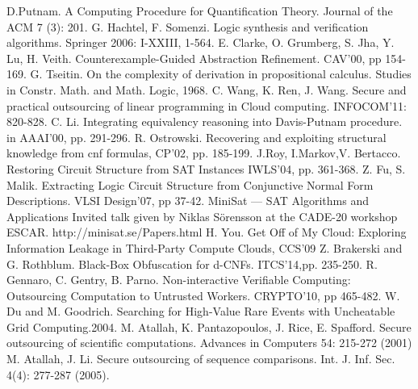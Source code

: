 \documentclass[runningheads,a4paper]{llncs}
\begin{document}
\begin{thebibliography}{4}


	D.Putnam. A Computing Procedure for Quantification Theory. 
Journal of the ACM 7 (3): 201.
	G. Hachtel, F. Somenzi.
Logic synthesis and verification algorithms. Springer 2006: I-XXIII, 1-564.
	E. Clarke, O. Grumberg, S. Jha, Y. Lu, H. Veith.
Counterexample-Guided Abstraction Refinement. 
CAV'00, pp 154-169.
	G. Tseitin. 
On the complexity of derivation in propositional calculus. Studies in Constr. Math. and Math. Logic, 1968.
	C. Wang, K. Ren, J. Wang.
Secure and practical outsourcing of linear programming in Cloud computing. INFOCOM'11: 820-828.
	C. Li.
Integrating equivalency reasoning into Davis-Putnam procedure. in AAAI'00, pp. 291-296.
	R. Ostrowski. 
Recovering and exploiting structural knowledge from cnf formulas, CP'02, pp. 185-199.
	J.Roy, I.Markov,V. Bertacco. 
Restoring Circuit Structure from SAT Instances IWLS'04, pp. 361-368.
	Z. Fu, S. Malik. 
Extracting Logic Circuit Structure from Conjunctive Normal Form Descriptions. 
VLSI Design'07, pp 37-42.
	MiniSat — SAT Algorithms and Applications Invited talk given by Niklas Sörensson at the CADE-20 workshop ESCAR. 
http://minisat.se/Papers.html
	H. You.
Get Off of My Cloud: Exploring Information Leakage in Third-Party Compute Clouds, CCS'09
	Z. Brakerski and G. Rothblum.
Black-Box Obfuscation for d-CNFs.
ITCS'14,pp. 235-250.
	R. Gennaro, C. Gentry, B. Parno.
Non-interactive Verifiable Computing: Outsourcing Computation to Untrusted Workers.
CRYPTO'10, pp 465-482.
	W. Du and M. Goodrich. 
Searching for High-Value Rare Events with Uncheatable Grid Computing.2004.
	M. Atallah, K. Pantazopoulos, J. Rice, E. Spafford.
Secure outsourcing of scientific computations. 
Advances in Computers 54: 215-272 (2001)
	M. Atallah, J. Li.
Secure outsourcing of sequence comparisons.
Int. J. Inf. Sec. 4(4): 277-287 (2005).

\end{thebibliography}
\end{document}
